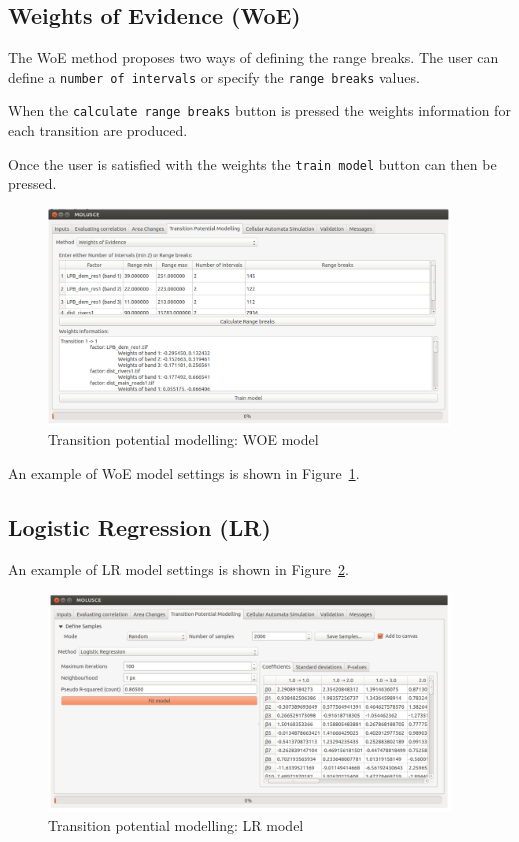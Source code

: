 \documentclass{report}
\begin{document}
\subsection{Weights of Evidence (WoE)}
The WoE \cite{bonham1989weights} method proposes two ways of defining the range breaks. 
The user can define a \verb+number of intervals+ or specify the 
\verb+range breaks+ values.

When the \verb+calculate range breaks+ button is pressed the weights information for each transition are
produced.

Once the user is satisfied with the weights the \verb+train model+ button can then be pressed.

\begin{figure}[h!]
\centering
\includegraphics[width=0.95\textwidth]{img/woe_model.png}
\caption{Transition potential modelling: WOE model}
\label{fig:woe_model}
\end{figure}

An example of WoE model settings is shown in Figure~\ref{fig:woe_model}.

\subsection{Logistic Regression (LR)}

An example of LR model settings is shown in Figure~\ref{fig:lr_model}.

\begin{figure}[h!]
\centering
\includegraphics[width=0.95\textwidth]{img/lr_model.png}
\caption{Transition potential modelling: LR model}
\label{fig:lr_model}
\end{figure}
\end{document}
